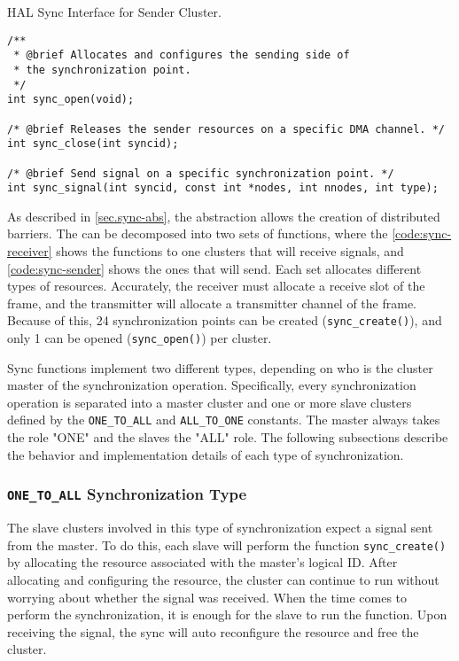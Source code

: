 \begin{listing}[t]
\caption{HAL Sync Interface for Sender Cluster.}
\label{code:sync-sender}
\begin{verbatim}
/**
 * @brief Allocates and configures the sending side of
 * the synchronization point.
 */
int sync_open(void);

/* @brief Releases the sender resources on a specific DMA channel. */
int sync_close(int syncid);

/* @brief Send signal on a specific synchronization point. */
int sync_signal(int syncid, const int *nodes, int nnodes, int type);
\end{verbatim}
\end{listing}

			As described in \autoref{sec.sync-abs}, the \sync abstraction allows the
			creation of distributed barriers.
			The \sync can be decomposed into two sets of functions, where the
			\autoref{code:sync-receiver} shows the functions to one clusters
			that will receive signals, and \autoref{code:sync-sender} shows the
			ones that will send.
			Each set allocates different types of resources.
			Accurately, the receiver must allocate a receive slot of the frame,
			and the transmitter will allocate a transmitter channel of the frame.
			Because of this, 24 synchronization points can be created (\texttt{sync\_create()}),
			and only 1 can be opened (\texttt{sync\_open()}) per cluster.

			Sync functions implement two different types, depending on who is the
			cluster master of the synchronization operation.
			Specifically, every synchronization operation is separated into a
			master cluster and one or more slave clusters defined by the
			\texttt{ONE\_TO\_ALL} and \texttt{ALL\_TO\_ONE} constants.
			The master always takes the role "ONE" and the slaves the "ALL" role.
			The following subsections describe the behavior and implementation
			details of each type of synchronization.

				\subsubsection*{\texttt{ONE\_TO\_ALL} Synchronization Type}

					The slave clusters involved in this type of synchronization expect
					a signal sent from the master.
					To do this, each slave will perform the function \texttt{sync\_create()}
					by allocating the resource associated with the master's logical ID.
					After allocating and configuring the resource, the cluster can
					continue to run without worrying about whether the signal was received.
					When the time comes to perform the synchronization, it is enough for
					the slave to run the function.
					Upon receiving the signal, the sync will auto reconfigure the resource
					and free the cluster.

